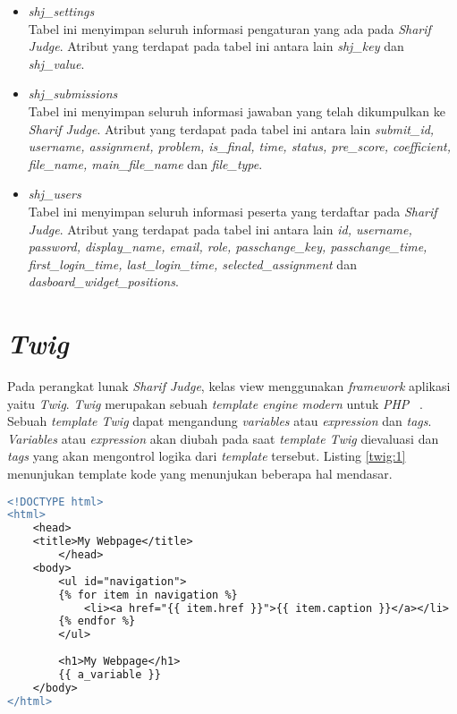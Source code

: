 \begin{itemize}
	\item \textit{shj\_settings} \\
	Tabel ini menyimpan seluruh informasi pengaturan yang ada pada \textit{Sharif Judge}. Atribut yang terdapat pada tabel ini antara lain \textit{shj\_key} dan \textit{shj\_value}.
	\item \textit{shj\_submissions} \\
	Tabel ini menyimpan seluruh informasi jawaban yang telah dikumpulkan ke \textit{Sharif Judge}. Atribut yang terdapat pada tabel ini antara lain \textit{submit\_id, username, assignment, problem, is\_final, time, status, pre\_score, coefficient, file\_name, main\_file\_name} dan \textit{file\_type}.
	\item \textit{shj\_users} \\
	Tabel ini menyimpan seluruh informasi peserta yang terdaftar pada \textit{Sharif Judge}. Atribut yang terdapat pada tabel ini antara lain \textit{id, username, password, display\_name, email, role, passchange\_key, passchange\_time, first\_login\_time, last\_login\_time, selected\_assignment} dan \textit{dasboard\_widget\_positions}.
\end{itemize}

\section{\textit{Twig}}
Pada perangkat lunak \textit{\textit{Sharif Judge}}, kelas view menggunakan \textit{framework} aplikasi yaitu \textit{Twig}. \textit{Twig} merupakan sebuah \textit{template engine modern} untuk \textit{PHP} ~\cite{fabien:09:twig}. Sebuah \textit{template Twig} dapat mengandung \textit{variables} atau \textit{expression} dan \textit{tags}. \textit{Variables} atau \textit{expression} akan diubah pada saat \textit{template Twig} dievaluasi dan \textit{tags} yang akan mengontrol logika dari \textit{template} tersebut. Listing \ref{twig:1} menunjukan template kode yang menunjukan beberapa hal mendasar.

\begin{lstlisting}[language=diff, caption=Template Kode , label=twig:1, basicstyle=\ttfamily, frame=single,
columns=fullflexible, keepspaces=true]
<!DOCTYPE html>
<html>
	<head>
	<title>My Webpage</title>
		</head>
	<body>
		<ul id="navigation">
		{% for item in navigation %}
			<li><a href="{{ item.href }}">{{ item.caption }}</a></li>
		{% endfor %}
		</ul>
		
		<h1>My Webpage</h1>
		{{ a_variable }}
	</body>
</html>
\end{lstlisting}

